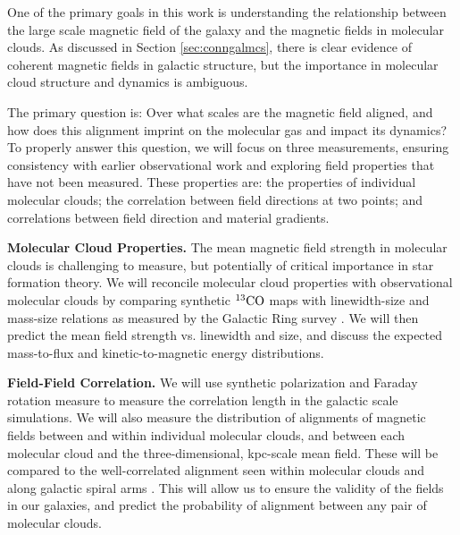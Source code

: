 
One of the primary goals in this work is understanding the
relationship between the large scale magnetic field
of the galaxy and the magnetic fields in molecular clouds.  As discussed in Section \ref{sec:conngalmcs}, there is clear evidence of
coherent magnetic fields in galactic structure, but the importance in
molecular cloud structure and dynamics is ambiguous.  

The primary question is:
Over what scales are the magnetic field aligned, and how does this alignment
imprint on the molecular gas and impact its dynamics?  To properly answer this
question, we will focus on three measurements, ensuring consistency with earlier
observational work and exploring field properties that have not been measured.
These properties are: the properties of individual molecular clouds;
the correlation between field
directions at two points; and correlations between field direction and material
gradients.  

\noindent
{\bf Molecular Cloud Properties.}
The mean magnetic field strength in molecular clouds is challenging to measure,
but potentially of critical importance in star formation theory.  We will reconcile
molecular cloud properties with observational molecular clouds by comparing
synthetic $^{13}\rm{CO}$ maps with linewidth-size and mass-size relations as
measured by the Galactic Ring survey \citep{Jackson06,Roman-Duval10}.  We will
then predict the mean field strength vs. linewidth and size, and discuss the
expected mass-to-flux and kinetic-to-magnetic energy distributions.

\noindent
{\bf Field-Field Correlation.}
We will use 
synthetic polarization and Faraday rotation measure to measure the correlation
length in the galactic scale simulations.  We will also measure the distribution
of alignments of magnetic fields between and within individual molecular clouds,
and between each molecular cloud and the three-dimensional, kpc-scale
mean field.
These will be compared to the well-correlated alignment seen within molecular
clouds \citep{Li09} and  along galactic spiral arms \citep{Fletcher11}.  This will
allow us to ensure the validity of the fields in our galaxies, and predict the
probability of alignment between any pair of molecular clouds.

